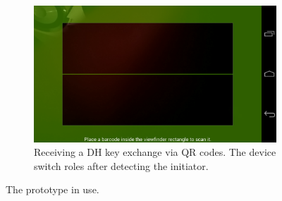 \documentclass[conference, 11pt]{sty/IEEEtran}
\begin{document}
\begin{figure}
\begin{subfigure}{0.28\textwidth}
\includegraphics[width=\textwidth]{../screenshots/Screenshot_2013-12-01-20-51-38.png}
\caption{Receiving a DH key exchange via QR codes. The device switch roles after detecting the initiator.}
\end{subfigure}
\caption{The prototype in use.}
\label{figui}
\end{figure}




\end{document}
